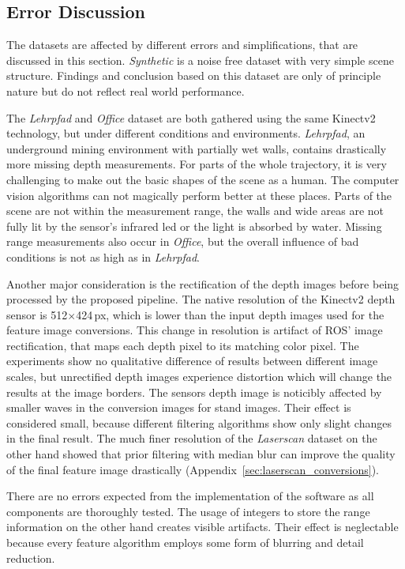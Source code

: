 \subsection{Error Discussion}

The datasets are affected by different errors and simplifications, that are discussed in this section.
\emph{Synthetic} is a noise free dataset with very simple scene structure.
Findings and conclusion based on this dataset are only of principle nature but do not reflect real world performance.

The \emph{Lehrpfad} and \emph{Office} dataset are both gathered using the same Kinectv2 technology, but under different conditions and environments.
\emph{Lehrpfad}, an underground mining environment with partially wet walls, contains drastically more missing depth measurements.
For parts of the whole trajectory, it is very challenging to make out the basic shapes of the scene as a human.
The computer vision algorithms can not magically perform better at these places.
Parts of the scene are not within the measurement range, the walls and wide areas are not fully lit by the sensor's infrared \acrshort{led} or the light is absorbed by water.
Missing range measurements also occur in \emph{Office}, but the overall influence of bad conditions is not as high as in \emph{Lehrpfad}.

Another major consideration is the rectification of the depth images before being processed by the proposed pipeline.
The native resolution of the Kinectv2 depth sensor is 512$\times$424\,px\cite{wasenmuller_accv2016}, which is lower than the input depth images used for the feature image conversions.
This change in resolution is artifact of \acrshort{ROS}' image rectification, that maps each depth pixel to its matching color pixel.
The experiments show no qualitative difference of results between different image scales, but unrectified depth images experience distortion which will change the results at the image borders.
The sensors depth image is noticibly affected by smaller waves in the conversion images for stand images.
Their effect is considered small, because different filtering algorithms show only slight changes in the final result.
The much finer resolution of the \emph{Laserscan} dataset on the other hand showed that prior filtering with median blur can improve the quality of the final feature image drastically (Appendix~\ref{sec:laserscan_conversions}).

There are no errors expected from the implementation of the software as all components are thoroughly tested.
The usage of integers to store the range information on the other hand creates visible artifacts.
Their effect is neglectable because every feature algorithm employs some form of blurring and detail reduction.
